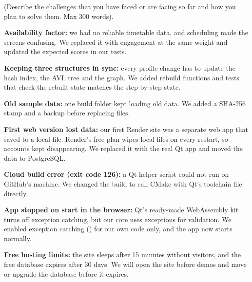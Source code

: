   {(Describe the challenges that you have faced or are facing so far and how you plan to solve them. Max 300 words).}
\TFgap{6.1bp}
\begin{answerbox}
\begin{tfbullets}
\item \textbf{Availability factor:} we had no reliable timetable data, and scheduling made the screens
      confusing. We replaced it with engagement at the same weight and updated the expected scores in
      our tests.
\item \textbf{Keeping three structures in sync:} every profile change has to update the hash index, the
      AVL tree and the graph. We added rebuild functions and tests that check the rebuilt state matches
      the step-by-step state.
\item \textbf{Old sample data:} one build folder kept loading old data. We added a SHA-256 stamp and a
      backup before replacing files.
\item \textbf{First web version lost data:} our first Render site was a separate web app that saved to a
      local file. Render's free plan wipes local files on every restart, so accounts kept disappearing.
      We replaced it with the real Qt app and moved the data to PostgreSQL.
\item \textbf{Cloud build error (exit code 126):} a Qt helper script could not run on GitHub's machine.
      We changed the build to call CMake with Qt's toolchain file directly.
\item \textbf{App stopped on start in the browser:} Qt's ready-made WebAssembly kit turns off exception
      catching, but our core uses exceptions for validation. We enabled exception catching
      () for our own code only, and the app now starts normally.
\item \textbf{Free hosting limits:} the site sleeps after 15 minutes without visitors, and the free
      database expires after 30 days. We will open the site before demos and move or upgrade the
      database before it expires.
\end{tfbullets}
\end{answerbox}

